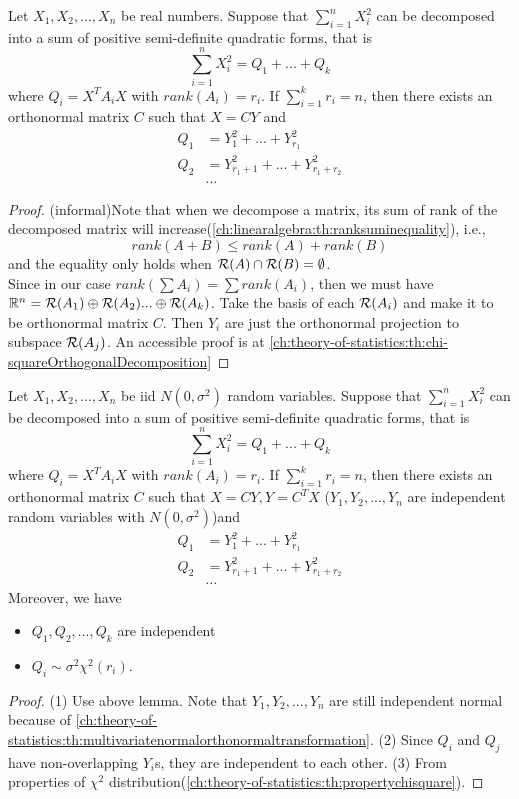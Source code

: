 \begin{refsection}
\begin{lemma}
	Let $X_1,X_2,...,X_n$ be real numbers. Suppose that $\sum_{i=1}^n X_i^2$ can be decomposed into a sum of  positive semi-definite quadratic forms, that is
	$$\sum_{i=1}^n X_i^2 = Q_1 + ... + Q_k$$
	where $Q_i = X^TA_iX$ with $rank(A_i) = r_i$. If $\sum_{i=1}^k r_i = n$, then there exists an orthonormal matrix $C$ such that $X = CY$ and
	\begin{align*}
	Q_1 &= Y_1^2 + ... + Y_{r_1}^2\\
	Q_2 &= Y_{r_1+1}^2 + ... + Y_{r_1 + r_2}^2\\
	& \dots
	\end{align*}
\end{lemma}
\begin{proof}
	(informal)Note that when we decompose a matrix, its sum of rank of the decomposed matrix will increase(\autoref{ch:linearalgebra:th:ranksuminequality}), i.e., 
	$$rank(A + B) \leq rank(A) + rank(B)$$
	and the equality only holds when $\mathcal{R}(A)\cap \mathcal{R}(B) = \emptyset$. \\
	Since in our case $rank(\sum A_i) = \sum rank(A_i)$, then we must have $\mathbb{R}^n = \mathcal{R}(A_1)\oplus\mathcal{R}(A_2)... \oplus\mathcal{R}(A_k)$. Take the basis of each $\mathcal{R}(A_i)$ and make it to be orthonormal matrix $C$. Then $Y_i$ are just the orthonormal projection to subspace $\mathcal{R}(A_j)$.
	An accessible proof is at \autoref{ch:theory-of-statistics:th:chi-squareOrthogonalDecomposition}
\end{proof}



\begin{theorem}\label{ch:theory-of-statistics:th:cochrantheorem}
	Let $X_1,X_2,...,X_n$ be iid $N(0,\sigma^2)$ random variables.
	Suppose that $\sum_{i=1}^n X_i^2$ can be decomposed into a sum of  positive semi-definite quadratic forms, that is
	$$\sum_{i=1}^n X_i^2 = Q_1 + ... + Q_k$$
	where $Q_i = X^TA_iX$ with $rank(A_i) = r_i$. If $\sum_{i=1}^k r_i = n$, then there exists an orthonormal matrix $C$ such that $X = CY, Y = C^TX$ ($Y_1,Y_2,...,Y_n$ are independent random variables with $N(0,\sigma^2)$)and
	\begin{align*}
	Q_1 &= Y_1^2 + ... + Y_{r_1}^2\\
	Q_2 &= Y_{r_1+1}^2 + ... + Y_{r_1 + r_2}^2\\
	& \dots
	\end{align*}
	Moreover, we have
	\begin{itemize}
		\item $Q_1, Q_2,...,Q_k$ are independent
		\item $Q_i \sim \sigma^2 \chi^2(r_i)$.
	\end{itemize}
\end{theorem}
\begin{proof}
	(1) Use above lemma. Note that $Y_1,Y_2,...,Y_n$ are still independent normal because of \autoref{ch:theory-of-statistics:th:multivariatenormalorthonormaltransformation}. (2) Since $Q_i$ and $Q_j$ have non-overlapping $Y_i$s, they are independent to each other. 
	(3) From properties of $\chi^2$ distribution(\autoref{ch:theory-of-statistics:th:propertychisquare}).
\end{proof}



\end{refsection}
